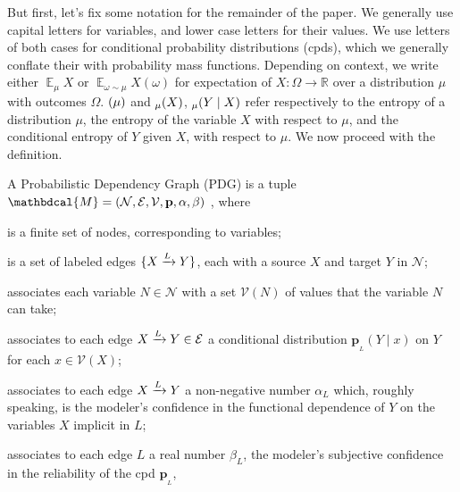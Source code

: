 \documentclass{article}
\theoremstyle{plain}
\theoremstyle{definition}
\let\H\relax
\DeclareMathOperator{\H}{\mathrm{H}} %
\DeclareMathOperator*{\Ex}{\mathbb{E}} %
\newcommand{\mat}[1]{\mathbf{#1}}
\newcommand{\bp}[1][L]{\mat{p}_{\!_{#1}\!}}
\newcommand{\V}{\mathcal V}
\newcommand{\N}{\mathcal N}
\newcommand{\Ed}{\mathcal E}
\newcommand{\dg}[1]{\mathbdcal{#1}}
\newcommand{\ed}[3]{%
		\mathchoice%
		{#2\overset{\smash{\mskip-5mu\raisebox{-3pt}{${#1}$}}}{\xrightarrow{\hphantom{\scriptstyle {#1}}}} #3} %
		{#2\overset{\smash{\mskip-5mu\raisebox{-3pt}{$\scriptstyle {#1}$}}}{\xrightarrow{\hphantom{\scriptstyle {#1}}}} #3}%
		{#2\overset{\smash{\mskip-5mu\raisebox{-3pt}{$\scriptscriptstyle {#1}$}}}{\xrightarrow{\hphantom{\scriptscriptstyle {#1}}}} #3} %
		{#2\overset{\smash{\mskip-5mu\raisebox{-3pt}{$\scriptscriptstyle {#1}$}}}{\xrightarrow{\hphantom{\scriptscriptstyle {#1}}}} #3}} %
\begin{document}
But first, let's fix some notation for the remainder of the paper.
We generally use capital letters for variables, and lower case letters for their values.
We use letters of both cases for conditional probability distributions (cpds), which we generally conflate their with probability mass functions. 
Depending on context, we write either $\Ex_\mu X$ or $\Ex_{\omega \sim \mu} X(\omega)$ for expectation of $X : \Omega \to \mathbb R$ over a distribution $\mu$ with outcomes $\Omega$.
$\H(\mu)$ and $\H_\mu(X)$, $\H_\mu(Y \mid X)$ refer respectively to the entropy of a distribution $\mu$, the entropy of the variable $X$ with respect to $\mu$, and the conditional entropy of $Y$ given $X$, with respect to $\mu$. 
We now proceed with the definition.

\begin{defn}\label{defn:pdg}
	A Probabilistic Dependency Graph (PDG) is a tuple $\dg M = (\N,\Ed,\V,\mat p, \alpha, \beta)$ , where
	\begin{description}[leftmargin=1em,labelindent=1.5em,itemsep=0pt]
		\item[$\N$]
			is a finite set of nodes, corresponding to variables;
		\item[$\Ed$]
			is a set of labeled  edges $\{ \ed LXY \}$, each with a source
			$X$ and target $Y$ in $\N$;
		\item[$\V$]
			associates each variable $N \in \N$ with a set $\V(N)$ of values that the variable $N$ can take;
		\item[$\mat p$]
		associates to each edge $\ed L{X}{Y} \in \Ed$
		a conditional distribution $\bp(Y \mid x)$ on $Y$ for each $x \in \V(X)$;
	\item[$\alpha$]
	associates to each edge $\ed L{X}{Y}$ a non-negative number $\alpha_L$ which,
	roughly speaking, is the modeler's confidence in the functional
	dependence of $Y$ on the variables $X$ implicit in $L$;
	\item[$\beta$]
	associates to each edge $L$ a real number $\beta_L$,
	the modeler's subjective confidence in the reliability of
	the cpd 
	$\bp$, 
	
	\end{description}
\end{defn}
\end{document}
